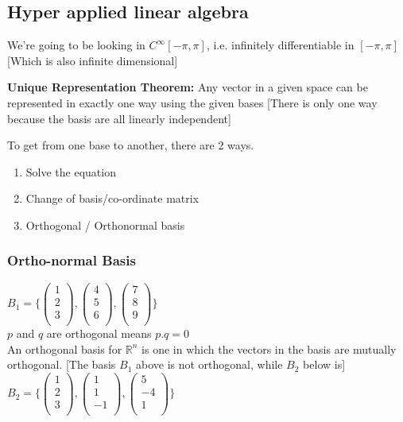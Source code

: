 \documentclass[11pt]{article}
\theoremstyle{definition}
\newcommand{\R}{\mathbb{R}}
\begin{document}
\subsection{Hyper applied linear algebra}
We're going to be looking in $C^\infty [-\pi, \pi]$, i.e. infinitely differentiable in $[-\pi, \pi]$ [Which is also infinite dimensional]

\textbf{Unique Representation Theorem:} Any vector in a given space can be represented in exactly one way using the given bases [There is only one way because the basis are all linearly independent]


To get from one base to another, there are 2 ways.
\begin{enumerate}[topsep=-10pt,itemsep=-5pt]
    \item Solve the equation
    \item Change of basis/co-ordinate matrix
    \item Orthogonal / Orthonormal basis
\end{enumerate}
\subsubsection{Ortho-normal Basis}

$B_1 = \{
\begin{pmatrix}
1\\
2\\
3\\
\end{pmatrix}, \begin{pmatrix}
4\\
5\\
6\\
\end{pmatrix}, \begin{pmatrix}
7\\
8\\
9\\
\end{pmatrix}\}$\\
$p$ and $q$ are orthogonal means $p . q = 0$\\
An orthogonal basis for $\R^n$ is one in which the vectors in the basis are mutually orthogonal. [The basis $B_1$ above is not orthogonal, while $B_2$ below is]\
$B_2 = \{
\begin{pmatrix}
1\\
2\\
3\\
\end{pmatrix}, \begin{pmatrix}
1\\
1\\
-1\\
\end{pmatrix}, \begin{pmatrix}
5\\
-4\\
1\\
\end{pmatrix}\}$\\
\end{document}
